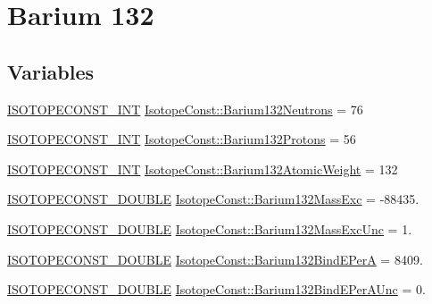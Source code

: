 \hypertarget{group___isotope_const-_barium-_ba132}{}\section{Barium 132}
\label{group___isotope_const-_barium-_ba132}
\subsection*{Variables}
\begin{DoxyCompactItemize}
\item 
\mbox{\hyperlink{group___isotope_const-_macros_ga5f18360b3e99483a35c32d789e62621c}{I\+S\+O\+T\+O\+P\+E\+C\+O\+N\+S\+T\+\_\+\+I\+NT}} \mbox{\hyperlink{group___isotope_const-_barium-_ba132_ga3ec85e4fd23d5198ffd4b49c0358dc17}{Isotope\+Const\+::\+Barium132\+Neutrons}} = 76
\item 
\mbox{\hyperlink{group___isotope_const-_macros_ga5f18360b3e99483a35c32d789e62621c}{I\+S\+O\+T\+O\+P\+E\+C\+O\+N\+S\+T\+\_\+\+I\+NT}} \mbox{\hyperlink{group___isotope_const-_barium-_ba132_ga597b3280a5a1a0a220fef4b1717fcbf7}{Isotope\+Const\+::\+Barium132\+Protons}} = 56
\item 
\mbox{\hyperlink{group___isotope_const-_macros_ga5f18360b3e99483a35c32d789e62621c}{I\+S\+O\+T\+O\+P\+E\+C\+O\+N\+S\+T\+\_\+\+I\+NT}} \mbox{\hyperlink{group___isotope_const-_barium-_ba132_ga32e75a7df01a6a80b650b9b5765d70f6}{Isotope\+Const\+::\+Barium132\+Atomic\+Weight}} = 132
\item 
\mbox{\hyperlink{group___isotope_const-_macros_ga8f45a7272ce02c0b4c65c44636ed719a}{I\+S\+O\+T\+O\+P\+E\+C\+O\+N\+S\+T\+\_\+\+D\+O\+U\+B\+LE}} \mbox{\hyperlink{group___isotope_const-_barium-_ba132_ga006e576ebef801ca8463cd00fc525904}{Isotope\+Const\+::\+Barium132\+Mass\+Exc}} = -\/88435.
\item 
\mbox{\hyperlink{group___isotope_const-_macros_ga8f45a7272ce02c0b4c65c44636ed719a}{I\+S\+O\+T\+O\+P\+E\+C\+O\+N\+S\+T\+\_\+\+D\+O\+U\+B\+LE}} \mbox{\hyperlink{group___isotope_const-_barium-_ba132_gaf25ab754636b4e2e36e36f3336c428e8}{Isotope\+Const\+::\+Barium132\+Mass\+Exc\+Unc}} = 1.
\item 
\mbox{\hyperlink{group___isotope_const-_macros_ga8f45a7272ce02c0b4c65c44636ed719a}{I\+S\+O\+T\+O\+P\+E\+C\+O\+N\+S\+T\+\_\+\+D\+O\+U\+B\+LE}} \mbox{\hyperlink{group___isotope_const-_barium-_ba132_ga905b2bb479851eaadf540717a0fc796d}{Isotope\+Const\+::\+Barium132\+Bind\+E\+PerA}} = 8409.
\item 
\mbox{\hyperlink{group___isotope_const-_macros_ga8f45a7272ce02c0b4c65c44636ed719a}{I\+S\+O\+T\+O\+P\+E\+C\+O\+N\+S\+T\+\_\+\+D\+O\+U\+B\+LE}} \mbox{\hyperlink{group___isotope_const-_barium-_ba132_ga8236ba7b2c0ce338d0c410a335e36beb}{Isotope\+Const\+::\+Barium132\+Bind\+E\+Per\+A\+Unc}} = 0.

\end{DoxyCompactItemize}

